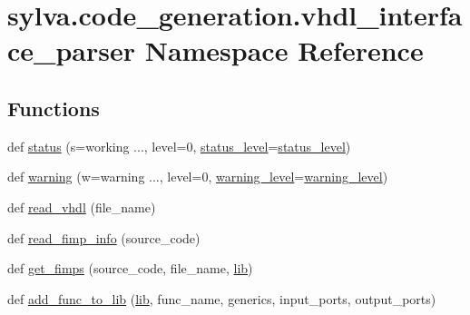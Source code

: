 \hypertarget{namespacesylva_1_1code__generation_1_1vhdl__interface__parser}{}\section{sylva.\+code\+\_\+generation.\+vhdl\+\_\+interface\+\_\+parser Namespace Reference}
\label{namespacesylva_1_1code__generation_1_1vhdl__interface__parser}
\subsection*{Functions}
\begin{DoxyCompactItemize}
\item 
def \hyperlink{namespacesylva_1_1code__generation_1_1vhdl__interface__parser_a531a0f0634e3fde1c48dc06c7c8c019f}{status} (s=\textquotesingle{}working ...\textquotesingle{}, level=0, \hyperlink{namespacesylva_1_1code__generation_1_1vhdl__interface__parser_ab023ab99252ae045bf3ce5e948f363ae}{status\+\_\+level}=\hyperlink{namespacesylva_1_1code__generation_1_1vhdl__interface__parser_ab023ab99252ae045bf3ce5e948f363ae}{status\+\_\+level})
\item 
def \hyperlink{namespacesylva_1_1code__generation_1_1vhdl__interface__parser_a63f8ceba954ddb8e1d7713fead5ffc9c}{warning} (w=\textquotesingle{}warning ...\textquotesingle{}, level=0, \hyperlink{namespacesylva_1_1code__generation_1_1vhdl__interface__parser_aa82bc16742c29c741d43cf3819798d86}{warning\+\_\+level}=\hyperlink{namespacesylva_1_1code__generation_1_1vhdl__interface__parser_aa82bc16742c29c741d43cf3819798d86}{warning\+\_\+level})
\item 
def \hyperlink{namespacesylva_1_1code__generation_1_1vhdl__interface__parser_afc25f8fd1bfc69960af11938f1e9b305}{read\+\_\+vhdl} (file\+\_\+name)
\item 
def \hyperlink{namespacesylva_1_1code__generation_1_1vhdl__interface__parser_af04b13914bd754706782c30d090504f5}{read\+\_\+fimp\+\_\+info} (source\+\_\+code)
\item 
def \hyperlink{namespacesylva_1_1code__generation_1_1vhdl__interface__parser_a58e8d5a1d080f5c440889bddbbbb514a}{get\+\_\+fimps} (source\+\_\+code, file\+\_\+name, \hyperlink{namespacesylva_1_1code__generation_1_1vhdl__interface__parser_a2679c4ab5a9a87aa62090377cbe4c7f3}{lib})
\item 
def \hyperlink{namespacesylva_1_1code__generation_1_1vhdl__interface__parser_a58b4385448eeafc249f2d5ca96664814}{add\+\_\+func\+\_\+to\+\_\+lib} (\hyperlink{namespacesylva_1_1code__generation_1_1vhdl__interface__parser_a2679c4ab5a9a87aa62090377cbe4c7f3}{lib}, func\+\_\+name, generics, input\+\_\+ports, output\+\_\+ports)

\end{DoxyCompactItemize}

